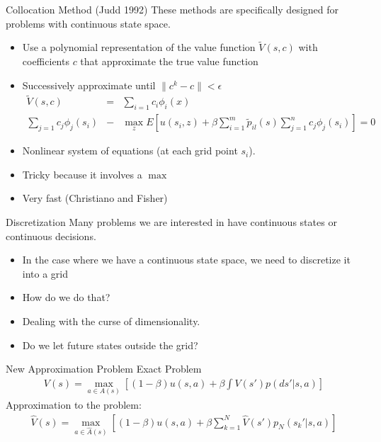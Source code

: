 \documentclass[xcolor=pdftex,dvipsnames,table,mathserif]{beamer}
\begin{document}
\begin{frame}{Collocation Method (Judd 1992)}
These methods are specifically designed for problems with continuous state space.
\begin{itemize}
\item Use a polynomial representation of the value function $\tilde{V}(s,c)$ with coefficients $c$ that approximate the true value function
\item Successively approximate until $\| c^k - c \| < \epsilon$
\begin{eqnarray*}
\tilde{V}(s,c) &=& \sum_{i=1}c_i \phi_i(x)\\
 \sum_{j=1} c_j \phi_j (s_i) &-& \max_z E \left[ u(s_i,z) + \beta \sum_{i=1}^m \tilde p_{il} (s) \sum_{j=1}^n c_j \phi_j (s_i) \right] = 0
\end{eqnarray*}
\item Nonlinear system of equations (at each grid point $s_i$).
\item Tricky because it involves a $\max$
\item Very fast (Christiano and Fisher)
\end{itemize}
\end{frame}

\begin{frame}{Discretization}
Many problems we are interested in have continuous states or continuous decisions.
\begin{itemize}
\item In the case where we have a continuous state space, we need to discretize it into a grid
\item How do we do that?
\item Dealing with the curse of dimensionality.
\item Do we let future states outside the grid?
\end{itemize}
\end{frame}

\begin{frame}{New Approximation Problem}
Exact Problem
\begin{eqnarray*}
V(s) = \max_{a \in A(s)} \left[ (1-\beta) u(s,a) + \beta \int V(s')p(ds' | s,a) \right]
\end{eqnarray*}
Approximation to the problem:
\begin{eqnarray*}
\hat{V}(s) = \max_{a \in \hat{A}(s)} \left[ (1-\beta) u(s,a) + \beta \sum_{k=1}^N \hat{V}(s')p_N (s_k' | s,a) \right]
\end{eqnarray*}
\end{frame}
\end{document}
